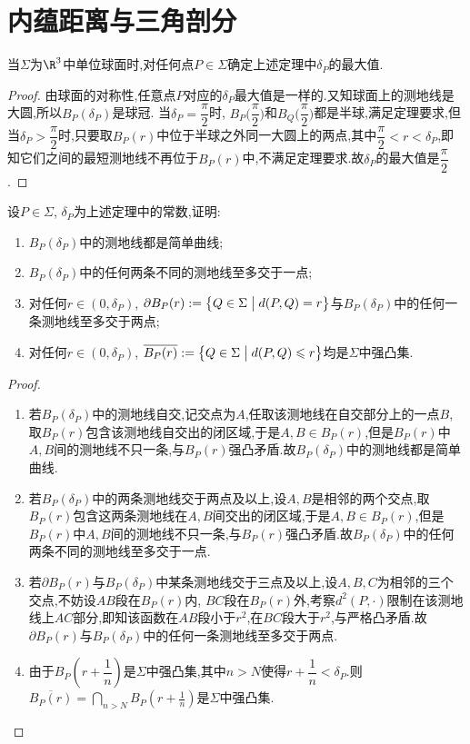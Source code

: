 \section{内蕴距离与三角剖分}
\begin{excise}
		当$\Sigma$为$\R^{3}$中单位球面时,对任何点$P\in\Sigma$确定上述定理中$\delta_{P}$的最大值.
	\end{excise}
	\begin{proof}
		由球面的对称性,任意点$P$对应的$\delta_{P}$最大值是一样的.又知球面上的测地线是大圆,所以$B_{P}(\delta_{P})$是球冠.
        当$\delta_{P}=\dfrac{\pi}{2}$时, $B_{P}\Big(\dfrac{\pi}{2}\Big)$和$B_{Q}\Big(\dfrac{\pi}{2}\Big)$都是半球,满足定理要求,但当$\delta_{P}>\dfrac{\pi}{2}$时,只要取$B_{P}(r)$中位于半球之外同一大圆上的两点,其中$\dfrac{\pi}{2}<r<\delta_{P}$,即知它们之间的最短测地线不再位于$B_{P}(r)$中,不满足定理要求.故$\delta_{P}$的最大值是$\dfrac{\pi}{2}$.
	\end{proof}
	\begin{excise}\label{12.2}
		设$P\in\Sigma$, $\delta_{P}$为上述定理中的常数,证明:
		\begin{enumerate}[label=(\roman*)]
			\item\label{12.2.1} $B_{P}(\delta_{P})$中的测地线都是简单曲线;
			\item\label{12.2.2} $B_{P}(\delta_{P})$中的任何两条不同的测地线至多交于一点;
			\item\label{12.2.3} 对任何$r\in(0,\delta_{P})$, $\partial B_{P}(r):=\left\{Q\in\Sigma\bigm|d(P,Q)=r\right\}$与$B_{P}(\delta_{P})$中的任何一条测地线至多交于两点;
			\item\label{12.2.4} 对任何$r\in(0,\delta_{P})$, $\overline{B_{P}(r)}:=\left\{Q\in\Sigma\bigm|d(P,Q)\leqslant r\right\}$均是$\Sigma$中强凸集.
		\end{enumerate}
	\end{excise}
	\begin{proof}
		\begin{enumerate}[label=(\roman*)]
			\item 若$B_{P}(\delta_{P})$中的测地线自交,记交点为$A$,任取该测地线在自交部分上的一点$B$,取$B_{P}(r)$包含该测地线自交出的闭区域,于是$A,B\in B_{P}(r)$,但是$B_{P}(r)$中$A,B$间的测地线不只一条,与$B_{P}(r)$强凸矛盾.故$B_{P}(\delta_{P})$中的测地线都是简单曲线.
			\item 若$B_{P}(\delta_{P})$中的两条测地线交于两点及以上,设$A,B$是相邻的两个交点,取$B_{P}(r)$包含这两条测地线在$A,B$间交出的闭区域,于是$A,B\in B_{P}(r)$,但是$B_{P}(r)$中$A,B$间的测地线不只一条,与$B_{P}(r)$强凸矛盾.故$B_{P}(\delta_{P})$中的任何两条不同的测地线至多交于一点.
			\item 若$\partial B_{P}(r)$与$B_{P}(\delta_{P})$中某条测地线交于三点及以上,设$A,B,C$为相邻的三个交点,不妨设$AB$段在$B_{P}(r)$内, $BC$段在$B_{P}(r)$外,考察$d^{2}(P,\cdot)$限制在该测地线上$AC$部分,即知该函数在$AB$段小于$r^{2}$,在$BC$段大于$r^{2}$,与严格凸矛盾.故$\partial B_{P}(r)$与$B_{P}(\delta_{P})$中的任何一条测地线至多交于两点.
			\item 由于$B_{P}\left(r+\dfrac{1}{n}\right)$是$\Sigma$中强凸集,其中$n>N$使得$r+\dfrac{1}{n}<\delta_{P}$.则$\displaystyle\overline{B_{P}(r)}=\bigcap_{n>N}B_{P}\left(r+\frac{1}{n}\right)$是$\Sigma$中强凸集.\qedhere
		\end{enumerate}
	\end{proof}
